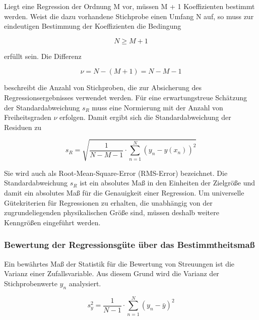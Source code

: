 \noindent Liegt eine Regression der Ordnung M vor, m\"{u}ssen M + 1 Koeffizienten bestimmt werden. Weist die dazu vorhandene Stichprobe einen Umfang N auf, so muss zur eindeutigen Bestimmung der Koeffizienten die Bedingung

\begin{equation}\label{eq:twelveonehundrednine}
N\ge M+1
\end{equation}

\noindent erf\"{u}llt sein. Die Differenz 

\begin{equation}\label{eq:twelveonehundredten}
\nu =N-(M+1)=N-M-1
\end{equation}

\noindent beschreibt die Anzahl von Stichproben, die zur Absicherung des Regressionsergebnisses verwendet werden. F\"{u}r eine erwartungstreue Sch\"{a}tzung der Standardabweichung $s_{R}$ muss eine Normierung mit der Anzahl von Freiheitsgraden $\nu$ erfolgen. Damit ergibt sich die Standardabweichung der Residuen zu

\begin{equation}\label{eq:twelveonehundredeleven}
s_{R} =\sqrt{\dfrac{1}{N-M-1} \cdot \sum _{n=1}^{N}(y_{n} -y(x_{n}))^{2}}
\end{equation}

\noindent Sie wird auch als Root-Mean-Square-Error (RMS-Error) bezeichnet. Die Standardabweichung $s_{R}$ ist ein absolutes Ma{\ss} in den Einheiten der Zielgr\"{o}{\ss}e und damit ein absolutes Ma{\ss} f\"{u}r die Genauigkeit einer Regression. Um universelle G\"{u}tekriterien f\"{u}r Regressionen zu erhalten, die unabh\"{a}ngig von der zugrundeliegenden physikalischen Gr\"{o}{\ss}e sind, m\"{u}ssen deshalb weitere Kenngr\"{o}{\ss}en eingef\"{u}hrt werden.

\subsubsection{Bewertung der Regressionsg\"{u}te \"{u}ber das Bestimmtheitsma{\ss}}

\noindent Ein bew\"{a}hrtes Ma{\ss} der Statistik f\"{u}r die Bewertung von Streuungen ist die Varianz einer Zufallsvariable. Aus diesem Grund wird die Varianz der Stichprobenwerte $y_{n}$ analysiert.

\begin{equation}\label{eq:twelveonehundredtwelve}
s_{y}^{2} =\dfrac{1}{N-1} \cdot \sum _{n=1}^{N}(y_{n} -\bar{y})^{2}
\end{equation}

